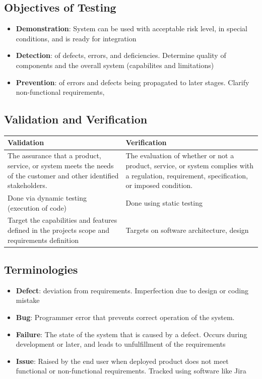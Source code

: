 \documentclass{article}
\begin{document}
\subsection{Objectives of Testing}
\begin{itemize}
    \item \textbf{Demonstration}: System can be used with acceptable risk level, in special conditions, and is ready for integration
    
    \item \textbf{Detection}: of defects, errors, and deficiencies. Determine quality of components and the overall system (capabilites and limitations)
    
    \item \textbf{Prevention}: of errors and defects being propagated to later stages. Clarify non-functional requirements, 
\end{itemize}

\subsection{Validation and Verification}
\begin{tabular}{|p{}|p{}|}
    \hline
    \textbf{Validation} & \textbf{Verification} \\
    \hline
    The assurance that a product, service, or system meets the needs of the customer and other identified stakeholders. & The evaluation of whether or not a product, service, or system complies with a regulation, requirement, specification, or imposed condition.  \\
    \hline
    Done via dynamic testing (execution of code) & Done using static testing \\
    \hline
    Target the capabilities and features defined in the projects scope and requirements definition & Targets on software architecture, design \\
    \hline
\end{tabular}

\subsection{Terminologies}
\begin{itemize}
    \item \textbf{Defect}: deviation from requirements. Imperfection due to design or coding mistake
    
    \item \textbf{Bug}: Programmer error that prevents correct operation of the system. 
    
    \item \textbf{Failure}: The state of the system that is caused by a defect. Occurs during development or later, and leads to unfulfillment of the requirements
    
    \item \textbf{Issue}: Raised by the end user when deployed product does not meet functional or non-functional requirements. Tracked using software like Jira
\end{itemize}
\end{document}
